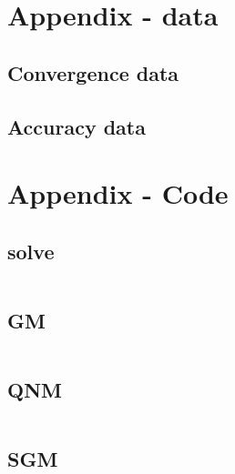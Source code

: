 \section{Appendix - data}
\label{sec:appendix}

\subsection{Convergence data}%
\label{sec:convergence_data}


\subsection{Accuracy data}%
\label{sec:appendix_accuracy}


\pagebreak
\section{Appendix - Code}
\subsection{solve}
\inputminted{matlab}{../src/uo_nn_solve.m}
\subsection{GM}
\inputminted{matlab}{../src/uo_nn_GM.m}
\subsection{QNM}
\inputminted{matlab}{../src/uo_nn_QNM.m}
\subsection{SGM}
\inputminted{matlab}{../src/uo_nn_SGM.m}

